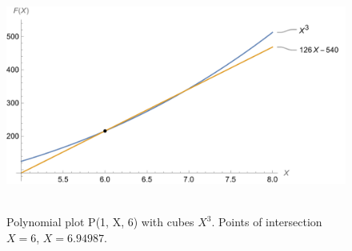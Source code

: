 ﻿\begin{figure}[H]
    \centering
    \includegraphics[width=1\textwidth]{sections/images/01_plots_polynomial_p1_n6_with_cubes}
    ~\caption{Polynomial plot P(1, X, 6) with cubes $X^3$.
    Points of intersection $X=6$, $X=6.94987$.}\label{fig:figure7}
\end{figure}
